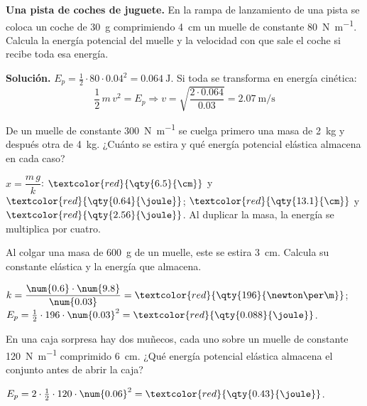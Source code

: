 \begin{example}
    \textbf{Una pista de coches de juguete.} En la rampa de lanzamiento de una pista se coloca un coche de \qty{30}{\g} comprimiendo
    \qty{4}{\cm} un muelle de constante \qty{80}{\newton\per\m}. Calcula la energía potencial del muelle y la velocidad con que sale el
    coche si recibe toda esa energía.

    \textbf{Solución.} \(E_p = \frac{1}{2} \cdot 80 \cdot \num{0.04}^2 = \qty{0.064}{\joule}\). Si toda se transforma en energía cinética:
    \[ \frac{1}{2}\,m\,v^2 = E_p \Rightarrow v = \sqrt{\frac{2 \cdot \num{0.064}}{\num{0.03}}} = \qty{2.07}{\m\per\s} \]
\end{example}

\begin{exercise}
    De un muelle de constante \qty{300}{\newton\per\m} se cuelga primero una masa de \qty{2}{\kg} y después otra de \qty{4}{\kg}.
    ¿Cuánto se estira y qué energía potencial elástica almacena en cada caso?
    \begin{solu}
        \(x = \dfrac{m\,g}{k}\): \(\textcolor{red}{\qty{6.5}{\cm}}\) y \(\textcolor{red}{\qty{0.64}{\joule}}\); \(\textcolor{red}{\qty{13.1}{\cm}}\)
        y \(\textcolor{red}{\qty{2.56}{\joule}}\). Al duplicar la masa, la energía se multiplica por cuatro.
    \end{solu}
\end{exercise}

\begin{exercise}
    Al colgar una masa de \qty{600}{\g} de un muelle, este se estira \qty{3}{\cm}. Calcula su constante elástica y la energía que
    almacena.
    \begin{solu}
        \(k = \dfrac{\num{0.6} \cdot \num{9.8}}{\num{0.03}} = \textcolor{red}{\qty{196}{\newton\per\m}}\);
        \(E_p = \frac{1}{2} \cdot 196 \cdot \num{0.03}^2 = \textcolor{red}{\qty{0.088}{\joule}}\).
    \end{solu}
\end{exercise}

\begin{exercise}
    En una caja sorpresa hay dos muñecos, cada uno sobre un muelle de constante \qty{120}{\newton\per\m} comprimido \qty{6}{\cm}. ¿Qué
    energía potencial elástica almacena el conjunto antes de abrir la caja?
    \begin{solu}
        \(E_p = 2 \cdot \frac{1}{2} \cdot 120 \cdot \num{0.06}^2 = \textcolor{red}{\qty{0.43}{\joule}}\).
    \end{solu}
\end{exercise}

